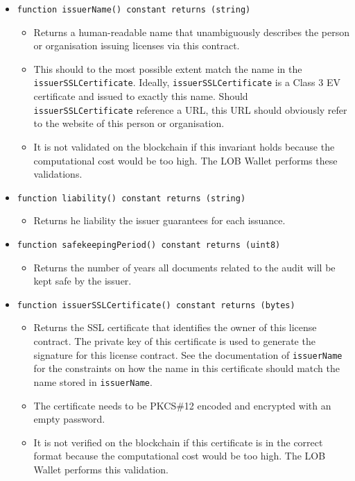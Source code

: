 \documentclass[a4paper]{article}
\begin{document}
\begin{itemize}
  \item \texttt{function issuerName() constant returns (string)}
  \begin{itemize}
    \item Returns a human-readable name that unambiguously describes the person or organisation issuing licenses via this contract.
    \item This should to the most possible extent match the name in the \texttt{issuerSSLCertificate}. Ideally, \texttt{issuerSSLCertificate} is a Class 3 EV certificate and issued to exactly this name. Should \texttt{issuerSSLCertificate} reference a URL, this URL should obviously refer to the website of this person or organisation.
    \item It is not validated on the blockchain if this invariant holds because the computational cost would be too high. The LOB Wallet performs these validations.
  \end{itemize}
  
  \item \texttt{function liability() constant returns (string)}
  \begin{itemize}
    \item Returns he liability the issuer guarantees for each issuance.
  \end{itemize}
  
  \item \texttt{function safekeepingPeriod() constant returns (uint8)}
  \begin{itemize}
    \item Returns the number of years all documents related to the audit will be kept safe by the issuer.
  \end{itemize}
  
  \item \texttt{function issuerSSLCertificate() constant returns (bytes)}
  \begin{itemize}
    \item Returns the SSL certificate that identifies the owner of this license contract. The private key of this certificate is used to generate the signature for this license contract. See the documentation of \texttt{issuerName} for the  constraints on how the name in this certificate should match the name  stored in \texttt{issuerName}.
    \item The certificate needs to be PKCS\#12 encoded and encrypted with an empty password.
    \item It is not verified on the blockchain if this certificate is in the correct format because the computational cost would be too high. The LOB Wallet performs this validation.
  \end{itemize}
  

\end{itemize}
\end{document}
